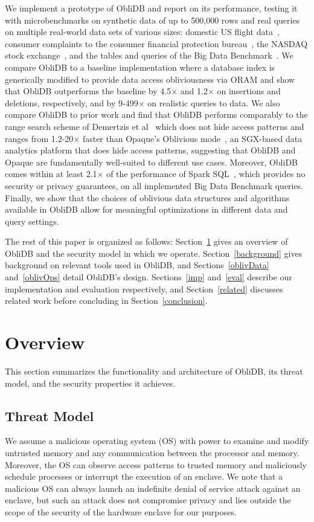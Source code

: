 \documentclass[letterpaper,twocolumn,10pt]{article}
\def\name/{ObliDB}
\begin{document}
We implement a prototype of \name/ and report on its performance, testing it with microbenchmarks on synthetic data of up to 500,000 rows and real queries on multiple real-world data sets of various sizes: domestic US flight data~\cite{FLIGHT}, consumer complaints to the consumer financial protection bureau~\cite{CFPB}, the NASDAQ stock exchange~\cite{NASDAQ}, and the tables and queries of the Big Data Benchmark~\cite{BDB}. We compare \name/ to a baseline implementation where a database index is generically modified to provide data access obliviousness via ORAM and show that \name/ outperforms the baseline by 4.5$\times$ and 1.2$\times$ on insertions and deletions, respectively, and by 9-499$\times$ on realistic queries to data. We also compare \name/ to prior work and find that \name/ performs comparably to the range search scheme of Demertzis et al~\cite{DPP+16} which does not hide access patterns and ranges from 1.2-20$\times$ faster than Opaque's Oblivious mode~\cite{ZDB+17}, an SGX-based data analytics platform that does hide access patterns, suggesting that \name/ and Opaque are fundamentally well-suited to different use cases. Moreover, \name/ comes within at least 2.1$\times$ of the performance of Spark SQL~\cite{SparkSQL}, which provides no security or privacy guarantees, on all implemented Big Data Benchmark queries. Finally, we show that the choices of oblivious data structures and algorithms available in \name/ allow for meaningful optimizations in different data and query settings. 

The rest of this paper is organized as follows: Section~\ref{model} gives an overview of \name/ and the security model in which we operate. Section~\ref{background} gives background on relevant tools used in \name/, and Sections~\ref{oblivData} and~\ref{oblivOps} detail \name/'s design. Sections~\ref{imp} and~\ref{eval} describe our implementation and evaluation respectively, and Section~\ref{related} discusses related work before concluding in Section~\ref{conclusion}. 

\section{Overview}\label{model}
This section summarizes the functionality and architecture of \name/, its threat model, and the security properties it achieves. 

\subsection{Threat Model}
We assume a malicious operating system (OS) with power to examine and modify untrusted memory and any communication between the processor and memory. Moreover, the OS can observe access patterns to trusted memory and maliciously schedule processes or interrupt the execution of an enclave. We note that a malicious OS can always launch an indefinite denial of service attack against an enclave, but such an attack does not compromise privacy and lies outside the scope of the security of the hardware enclave for our purposes. 
\end{document}
